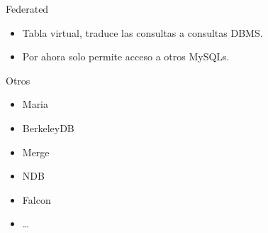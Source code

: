 \begin{frame}{Federated}
  \begin{itemize}
    \item Tabla virtual, traduce las consultas a consultas DBMS.
    \item Por ahora solo permite acceso a otros MySQLs.
  \end{itemize}
\end{frame}

\begin{frame}{Otros}
  \begin{itemize}
    \item Maria
    \item BerkeleyDB
    \item Merge
    \item NDB
    \item Falcon
    \item \dots
  \end{itemize}
\end{frame}
